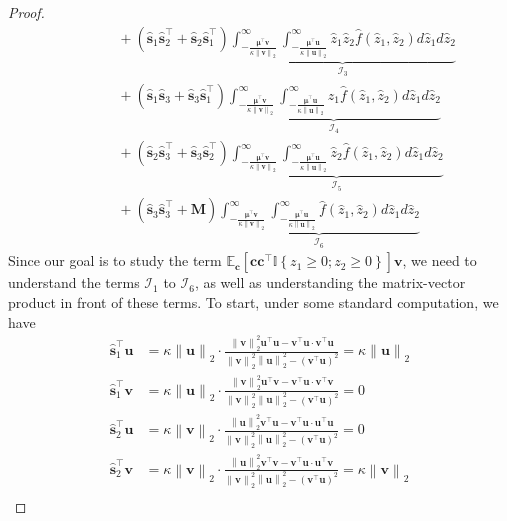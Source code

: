 \documentclass[10pt,a4paper]{amsart}
\def\bfM{{\mathbf{M}}}\def\bfN{{\mathbf{N}}}\def\bfO{{\mathbf{O}}}\def\bfP{{\mathbf{P}}}
\def\bfc{{\mathbf{c}}}\def\bfd{{\mathbf{d}}}
\def\bfs{{\mathbf{s}}}\def\bft{{\mathbf{t}}}
\def\bfu{{\mathbf{u}}}\def\bfv{{\mathbf{v}}}\def\bfw{{\mathbf{w}}}\def\bfx{{\mathbf{x}}}
\def\bfv{{\mathbf{v}}}\def\bfw{{\mathbf{w}}}\def\bfx{{\mathbf{x}}}
\newcommand{\indy}[1]{\mathbb{I}\left\{#1\right\}}
\newcommand{\norm}[1]{\left\|#1\right\|}
\newcommand{\paren}[1]{\left(#1\right)}
\providecommand{\E}{\mathbb{E}}
\begin{document}
\begin{proof}
\begin{align*}
        & \quad\quad\quad + \paren{\hat{\bfs}_1\hat{\bfs}_2^\top + \hat{\bfs}_2\hat{\bfs}_1^\top}\underbrace{\int_{-\frac{\bm{\mu}^\top\bfv}{\kappa\norm{\bfv}_2}}^\infty\int_{-\frac{\bm{\mu}^\top\bfu}{\kappa\norm{\bfu}_2}}^\infty\hat{z}_1\hat{z}_2\hat{f}(\hat{z}_1,\hat{z}_2)d\hat{z}_1d\hat{z}_2}_{\mathcal{I}_3}\\
        & \quad\quad\quad + \paren{\hat{\bfs}_1\hat{\bfs}_3 + \hat{\bfs}_3\hat{\bfs}_1^\top}\underbrace{\int_{-\frac{\bm{\mu}^\top\bfv}{\kappa\norm{\bfv}_2}}^\infty\int_{-\frac{\bm{\mu}^\top\bfu}{\kappa\norm{\bfu}_2}}^\infty\hat{z}_1\hat{f}(\hat{z}_1,\hat{z}_2)d\hat{z}_1d\hat{z}_2}_{\mathcal{I}_4}\\
        & \quad\quad\quad + \paren{\hat{\bfs}_2\hat{\bfs}_3^\top + \hat{\bfs}_3\hat{\bfs}_2^\top}\underbrace{\int_{-\frac{\bm{\mu}^\top\bfv}{\kappa\norm{\bfv}_2}}^\infty\int_{-\frac{\bm{\mu}^\top\bfu}{\kappa\norm{\bfu}_2}}^\infty\hat{z}_2\hat{f}(\hat{z}_1,\hat{z}_2)d\hat{z}_1d\hat{z}_2}_{\mathcal{I}_5}\\
        & \quad\quad\quad + \paren{\hat{\bfs}_3\hat{\bfs}_3^\top + \bfM}\underbrace{\int_{-\frac{\bm{\mu}^\top\bfv}{\kappa\norm{\bfv}_2}}^\infty\int_{-\frac{\bm{\mu}^\top\bfu}{\kappa\norm{\bfu}_2}}^\infty \hat{f}(\hat{z}_1,\hat{z}_2)d\hat{z}_1d\hat{z}_2}_{\mathcal{I}_6}
    \end{align*}
    Since our goal is to study the term $\E_{\bfc}\left[\bfc\bfc^\top\indy{z_1\geq 0;z_2\geq 0}\right]\bfv$, we need to understand the terms $\mathcal{I}_1$ to $\mathcal{I}_6$, as well as understanding the matrix-vector product in front of these terms. To start, under some standard computation, we have
    \begin{align*}
        \hat{\bfs}_1^\top\bfu &  = \kappa\norm{\bfu}_2\cdot \frac{\norm{\bfv}_2^2\bfu^\top\bfu - \bfv^\top\bfu\cdot\bfv^\top\bfu}{\norm{\bfv}_2^2\norm{\bfu}_2^2 - \paren{\bfv^\top\bfu}^2} = \kappa\norm{\bfu}_2\\
        \hat{\bfs}_1^\top\bfv &  = \kappa\norm{\bfu}_2\cdot \frac{\norm{\bfv}_2^2\bfu^\top\bfv - \bfv^\top\bfu\cdot\bfv^\top\bfv}{\norm{\bfv}_2^2\norm{\bfu}_2^2 - \paren{\bfv^\top\bfu}^2} = 0\\
        \hat{\bfs}_2^\top\bfu &  = \kappa\norm{\bfv}_2\cdot \frac{\norm{\bfu}_2^2\bfv^\top\bfu - \bfv^\top\bfu\cdot\bfu^\top\bfu}{\norm{\bfv}_2^2\norm{\bfu}_2^2 - \paren{\bfv^\top\bfu}^2} = 0\\
        \hat{\bfs}_2^\top\bfv &  = \kappa\norm{\bfv}_2\cdot \frac{\norm{\bfu}_2^2\bfv^\top\bfv - \bfv^\top\bfu\cdot\bfu^\top\bfv}{\norm{\bfv}_2^2\norm{\bfu}_2^2 - \paren{\bfv^\top\bfu}^2} = \kappa\norm{\bfv}_2\\

\end{align*}
\end{proof}
\end{document}

